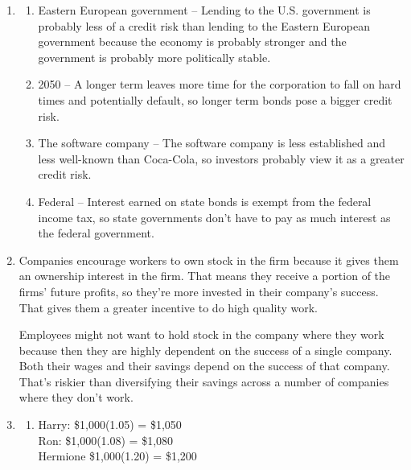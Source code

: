 \documentclass{article}
\begin{document}
\begin{enumerate}

\item

	\begin{enumerate}
	
	\item Eastern European government  -- Lending to the U.S. government is probably less of a credit risk than lending to the Eastern European government because the economy is probably stronger and the government is probably more politically stable.
	
	\item 2050 -- A longer term leaves more time for the corporation to fall on hard times and potentially default, so longer term bonds pose a bigger credit risk.
	
	\item The software company -- The software company is less established and less well-known than Coca-Cola, so investors probably view it as a greater credit risk.
	
	\item Federal -- Interest earned on state bonds is exempt from the federal income tax, so state governments don't have to pay as much interest as the federal government.
	
	\end{enumerate}
	
\item Companies encourage workers to own stock in the firm because it gives them an ownership interest in the firm. That means they receive a portion of the firms’ future profits, so they’re more invested in their company’s success. That gives them a greater incentive to do high quality work. 

Employees might not want to hold stock in the company where they work because then they are highly dependent on the success of a single company. Both their wages and their savings depend on the success of that company. That’s riskier than diversifying their savings across a number of companies where they don’t work.


\setcounter{enumi}{6}
	
\item

	\begin{enumerate}
	
	\item Harry: \$1,000(1.05) = \$1,050 \\
		Ron: \$1,000(1.08) = \$1,080 \\
		Hermione \$1,000(1.20) = \$1,200
		

\end{enumerate}
\end{enumerate}
\end{document}

